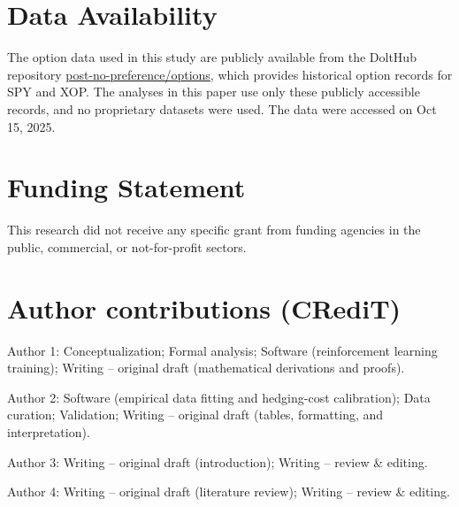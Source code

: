 \section*{Data Availability}
The option data used in this study are publicly available from the DoltHub repository \href{https://www.dolthub.com/repositories/post-no-preference/options}{post-no-preference/options}, which provides historical option records for SPY and XOP. The analyses in this paper use only these publicly accessible records, and no proprietary datasets were used. The data were accessed on Oct 15, 2025.

\section*{Funding Statement}
This research did not receive any specific grant from funding agencies in the public, commercial, or not-for-profit sectors.

\section*{Author contributions (CRediT)}
Author 1: Conceptualization; Formal analysis; Software (reinforcement learning training); Writing -- original draft (mathematical derivations and proofs).

Author 2: Software (empirical data fitting and hedging-cost calibration); Data curation; Validation; Writing -- original draft (tables, formatting, and interpretation).

Author 3: Writing -- original draft (introduction); Writing -- review \& editing.

Author 4: Writing – original draft (literature review); Writing -- review \& editing.